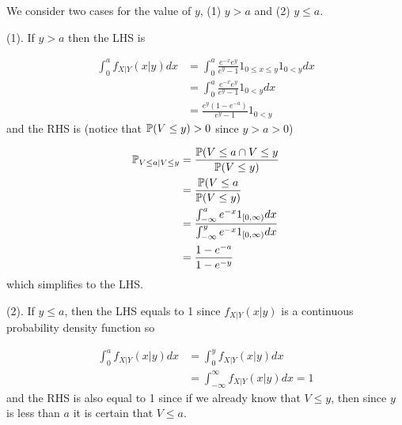 
We consider two cases for the value of $ y$, (1) $ y > a$ and (2) $ y \leq a$. 

(1). If $ y > a$ then the LHS is

\begin{align*}
    \int_{0}^{a} f_{X |Y} (x|y) dx &= \int_{0}^{a} \frac{e^{-x} e^{y} }{e^{y} -1} 1_{0 \leq x \leq
    y} 1_{0 < y} dx\\
				   &= \int_{0}^{a} \frac{e^{-x} e^{y} }{e^{y} -1} 1_{0 < y} dx\\
				   &= \frac{e^{y} (1-e^{-a} )}{e^{y} -1} 1_{0 < y} 
\end{align*}
and the RHS is (notice that $ \P(V \leq y) > 0$ since $ y > a > 0$)

\begin{align*}
    \P_{V \leq a | V \leq y} &= \frac{\P(V \leq a \cap V \leq y}{\P(V \leq y)}\\
			     &= \frac{\P(V \leq a}{\P(V \leq y)}\\
			     &= \frac{\int_{-\infty}^{a} e^{-x}1_{[0, \infty)} dx}{
			     \int_{-\infty}^{y} e^{-x} 1_{[0, \infty)}dx} \\
			     &= \frac{1-e^{-a} }{1-e^{-y} } 
\end{align*}
which simplifies to the LHS.

(2). If $ y \leq a$, then the LHS equals to 1 since $ f_{X|Y} (x|y)$ is a continuous probability
density function so 

\begin{align*}
    \int_{0}^{a} f_{X |Y} (x|y) dx &= \int_{0}^{y} f_{X|Y} (x|y) dx\\
				   &= \int_{-\infty}^{\infty} f_{X|Y} (x|y) dx=1
\end{align*}
and the RHS is also equal to 1 since if we already know that $ V\leq y$, then since $ y$ is less
than $ a$ it is certain that $ V \leq a$.
